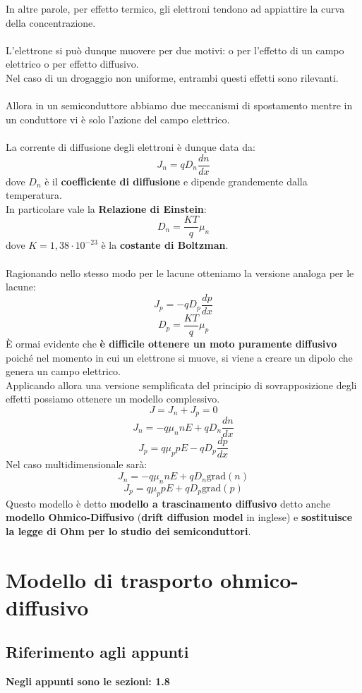 \documentclass{article}
\numberwithin{equation}{subsection}
\begin{document}
	In altre parole, per effetto termico, gli elettroni tendono ad appiattire la curva della concentrazione.\\\\
	L’elettrone si può dunque muovere per due motivi: o per l’effetto di un campo elettrico o per effetto diffusivo. \\
	Nel caso di un drogaggio non uniforme, entrambi questi effetti sono rilevanti.\\\\
	Allora in un semiconduttore abbiamo due meccanismi di spostamento mentre in un conduttore vi è solo l’azione del campo elettrico.\\\\
	La corrente di diffusione degli elettroni è dunque data da:
	$$J_n = q D_n \frac{dn}{dx}$$
	dove $D_n$ è il \textbf{coefficiente di diffusione} e dipende grandemente dalla temperatura. \\
	In particolare vale la \textbf{Relazione di Einstein}:
	$$D_n = \frac{KT}{q} \mu_n$$
	dove $K = 1,38 \cdot 10^{-23}$ è la \textbf{costante di Boltzman}.\\\\
	Ragionando nello stesso modo per le lacune otteniamo la versione analoga per le lacune:
	$$J_p = -q D_p \frac{dp}{dx}$$
	$$D_p = \frac{KT}{q} \mu_p$$
	È ormai evidente che \textbf{è difficile ottenere un moto puramente diffusivo} poiché nel momento in cui un elettrone si muove, si viene a creare un dipolo che genera un campo elettrico. \\
	Applicando allora una versione semplificata del principio di sovrapposizione degli effetti possiamo ottenere un modello complessivo.
	$$J = J_n + J_p = 0$$
	$$J_n = -q \mu_n n E + q D_n \frac{dn}{dx}$$
	$$J_p = q \mu_p p E - q D_p \frac{dp}{dx}$$
	Nel caso multidimensionale sarà:
	$$J_n = -q \mu_n n E + q D_n \text{grad}(n)$$
	$$J_p = q \mu_p p E + q D_p \text{grad}(p)$$
	Questo modello è detto \textbf{modello a trascinamento diffusivo} detto anche \textbf{modello Ohmico-Diffusivo} (\textbf{drift diffusion model} in inglese) e \textbf{sostituisce la legge di Ohm per lo studio dei semiconduttori}.
	\section{Modello di trasporto ohmico-diffusivo}
	\subsection{Riferimento agli appunti}
	\textbf{Negli appunti sono le sezioni: 1.8}
\end{document}
